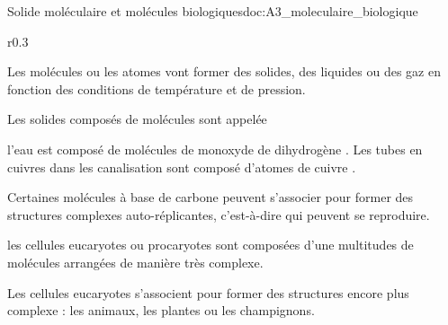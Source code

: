 \begin{doc}{Solide moléculaire et molécules biologiques}{doc:A3_moleculaire_biologique}
  \vspace*{-16pt}
  \begin{wrapfigure}{r}{0.3\linewidth}
    \vspace*{-22pt}
    \centering
  
  \end{wrapfigure}
  \phantom{bla}
  
  \begin{importants}
    Les molécules ou les atomes vont former des solides, des liquides ou des gaz en fonction des conditions de température et de pression.

    Les solides composés de molécules sont appelée 
  \end{importants}
  \exemple l'eau est composé de molécules de monoxyde de dihydrogène .
  Les tubes en cuivres dans les canalisation sont composé d'atomes de cuivre .
  
  \begin{importants}
    Certaines molécules à base de carbone peuvent s'associer pour former des structures complexes auto-réplicantes, c'est-à-dire qui peuvent se reproduire.
  \end{importants}
  \exemple les cellules eucaryotes ou procaryotes sont composées d'une multitudes de molécules arrangées de manière très complexe.

  \begin{importants}
    Les cellules eucaryotes s'associent pour former des structures encore plus complexe : les animaux, les plantes ou les champignons.
  \end{importants}
\end{doc}